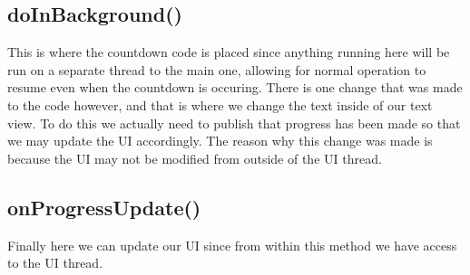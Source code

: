 \documentclass{scrartcl}
\begin{document}
\subsection*{doInBackground()}
This is where the countdown code is placed since anything running here will be run on a
separate thread to the main one, allowing for normal operation to resume even when the
countdown is occuring. There is one change that was made to the code however, and that
is where we change the text inside of our text view. To do this we actually need to
publish that progress has been made so that we may update the UI accordingly. The reason
why this change was made is because the UI may not be modified from outside of the UI thread.

\subsection*{onProgressUpdate()}
Finally here we can update our UI since from within this method we have access to the UI
thread.
\end{document}
